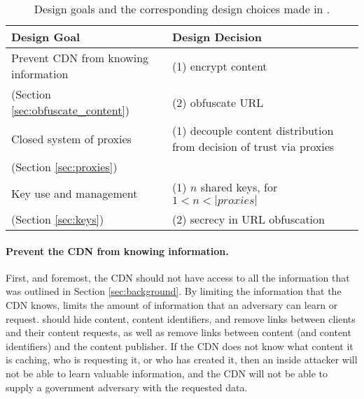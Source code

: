 \begin{table*}[t!]
\centering
\begin{tabular}{| l | l |} 
 \hline
 {\bf Design Goal} & {\bf Design Decision} \\ 
 \hline\hline
 Prevent CDN from knowing information & (1) encrypt content   \\ 
  (Section \ref{sec:obfuscate_content})                          & (2) obfuscate URL \\ \hline
 Closed system of proxies & (1) decouple content distribution from decision of trust via proxies  \\ 
  (Section \ref{sec:proxies})  & \\ \hline
 Key use and management & (1) $n$ shared keys, for $1 < n < |proxies|$ \\ 
   (Section \ref{sec:keys})                     & (2) secrecy in URL obfuscation \\ 
 \hline
\end{tabular}
\caption{Design goals and the corresponding design choices made in \system{}.}
\label{tab:design_goals}
\end{table*}

\paragraph{Prevent the CDN from knowing information.} First, and foremost, the CDN 
should not have access to all the information that was outlined 
in Section \ref{sec:background}.  By limiting the information that the CDN knows, \system{} limits 
the amount of information that an adversary can learn or request.  \system{} should hide 
content, content identifiers, and remove links between clients and their content requests, as well 
as remove links between content (and content identifiers) and the content publisher.  If the CDN 
does not know what content it is caching, who is requesting it, or who has created it, then an 
inside attacker will not be able to learn valuable information, and the CDN will not be able to supply 
a government adversary with the requested data.

